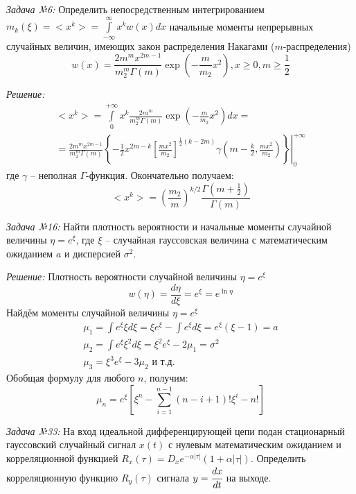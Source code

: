 \documentclass[14pt,final,titlepage,pscyr]{hedwork}
\begin{document}
\maketitle
\emph{Задача №6:} Определить непосредственным интегрированием \\
\( 
    m_k(\xi) = <x^k> = \int\limits_{-\infty}^{\infty} x^k w(x) dx
\) начальные моменты непрерывных случайных величин, имеющих закон распределения
Накагами (\( m \)-распределения)
\[
    w(x) = \frac{2m^m x^{2m-1}}{m_2^m \Gamma(m)}
        \exp\left( -\frac{m}{m_2}x^2 \right), x \geq 0, m \geq \frac{1}{2}
\]

\emph{Решение:}
\begin{gather}
    <x^k> = \int\limits_{0}^{+\infty} x^k 
        \frac{2m^m}{m_2^m \Gamma(m)}
        \exp\left( -\frac{m}{m_2}x^2 \right) dx = \nonumber \\
    = \frac{2m^m x^{2m-1}}{m_2^m \Gamma(m)}\left.\left\{ 
        -\frac{1}{2} x^{2m-k}\left[ 
            \frac{mx^2}{m_2}
        \right]^{\frac{1}{2}(k-2m)}
        \gamma\left( m-\frac{k}{2}, \frac{mx^2}{m_2} \right)
    \right\}\right|_{0}^{+\infty} \nonumber
\end{gather}
где \( \gamma \) -- неполная \( \Gamma \)-функция. Окончательно получаем:
\[
    <x^k> = \left( \frac{m_2}{m} \right)^{k/2} 
        \frac{\Gamma\left(m+\frac{1}{2}\right)}{\Gamma(m)}
\]

\emph{Задача №16:} Найти плотность вероятности и начальные моменты случайной 
величины \( \eta = e^\xi \), где \( \xi \) -- случайная гауссовская величина 
с математическим ожиданием \( a \) и дисперсией \( \sigma^2 \).

\emph{Решение:} Плотность вероятности случайной величины \( \eta = e^\xi \)
\[
    w(\eta) = \frac{d\eta}{d\xi} = e^{\xi} = e^{\ln\eta}
\]
Найдём моменты случайной величины \( \eta = e^\xi \)
\begin{gather}
    \mu_1 = \int e^\xi \xi d\xi = \xi e^\xi - \int e^\xi d\xi = 
        e^\xi( \xi - 1 ) = a \nonumber \\
    \mu_2 = \int e^\xi \xi^2 d\xi = \xi^2 e^\xi - 2\mu_1 = \sigma^2 
        \nonumber \\
    \mu_3 = \xi^3 e^\xi - 3\mu_2 \text{ и т.д.} \nonumber
\end{gather}
Обобщая формулу для любого \( n \), получим:
\[
    \mu_n = e^\xi \left[ 
        \xi^n - \sum\limits_{i=1}^{n-1}(n-i+1)!\xi^i - n! 
    \right]
\]

\newpage

\emph{Задача №33:} На вход идеальной дифференцирующей цепи подан стационарный 
гауссовский случайный сигнал \( x(t) \) с нулевым математическим ожиданием и 
корреляционной функцией 
\( R_x(\tau) = D_x e^{-\alpha|\tau|}(1 + \alpha|\tau|) \). Определить 
корреляционную функцию \( R_y(\tau) \) сигнала \( y = \cfrac{dx}{dt} \) на 
выходе.
\end{document}
